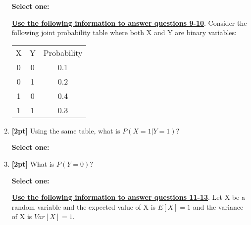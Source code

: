 \documentclass[12pt]{article}
\renewcommand{\circle}{\tikz\draw[black] (0,0) circle (1ex);}
\begin{document}
\begin{enumerate}
    \textbf{Select one:}

    
    \bigskip\bigskip\bigskip
    \textbf{\underline{Use the following information to answer questions 9-10}}. Consider the following joint probability table where both X and Y are binary variables:\\[12pt] 
    \begin{tabular}{ccc}
    X & Y & Probability \\
    0 & 0 & 0.1\\
    0 & 1 & 0.2\\
    1 & 0 & 0.4\\
    1 & 1 & 0.3
    \end{tabular}


    \item \textbf{[2pt]} Using the same table, what is $P(X = 1 | Y=1)$?

    \textbf{Select one:}

\clearpage
    \item \textbf{[2pt]} What is $P(Y=0)$?

    \textbf{Select one:}

    
    
    \bigskip\bigskip\bigskip
    \textbf{\underline{Use the following information to answer questions 11-13}}. Let X be a random variable and the expected value of X is $E[X] = 1$ and the variance of X is $Var[X] = 1$. 


\end{enumerate}
\end{document}
